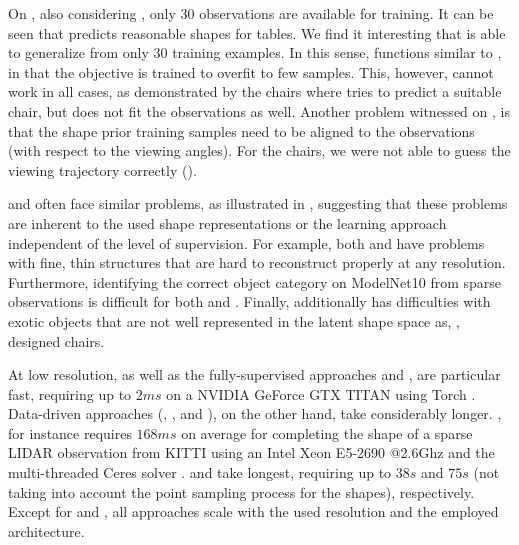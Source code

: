On \Kinect, also considering , only $30$ observations are available for training. It can be seen that \AML predicts reasonable shapes for tables. We find it interesting that \AML is able to generalize from only $30$ training examples. In this sense, \AML functions similar to \ML, in that the objective is trained to overfit to few samples. This, however, cannot work in all cases, as demonstrated by the chairs where \AML tries to predict a suitable chair, but does not fit the observations as well. Another problem witnessed on \Kinect, is that the shape prior training samples need to be aligned to the observations (with respect to the viewing angles). For the chairs, we were not able to guess the viewing trajectory correctly (\cf \citep{Yang2018ARXIVb}).

%
\AML and \Dai often face similar problems, as illustrated in , suggesting that these problems are inherent to the used shape representations or the learning approach independent of the level of supervision. For example, both \AML and \Dai have problems with fine, thin structures that are hard to reconstruct properly at any resolution. Furthermore, identifying the correct object category on ModelNet10 from sparse observations is difficult for both \AML and \Sup. Finally, \AML additionally has difficulties with exotic objects that are not well represented in the latent shape space as, \eg, designed chairs.

%
{At low resolution, \AML as well as the fully-supervised approaches \Dai and \Sup, are particular fast, requiring up to $2ms$ on a NVIDIA\texttrademark\xspace GeForce\textregistered\xspace GTX TITAN using Torch \citep{Collobert2011NIPSWORK}. Data-driven approaches (\eg, \Engelmann, \ICP and \ML), on the other hand, take considerably longer. \Engelmann, for instance requires $168ms$ on average for completing the shape of a sparse LIDAR observation from KITTI using an Intel\textregistered\xspace Xeon\textregistered\xspace E5-2690 @2.6Ghz and the multi-threaded Ceres solver \citep{AgarwalCeres}. \ICP and \ML take longest, requiring up to $38s$ and $75s$ (not taking into account the point sampling process for the shapes), respectively. Except for \Engelmann and \ICP, all approaches scale with the used resolution and the employed architecture.}
